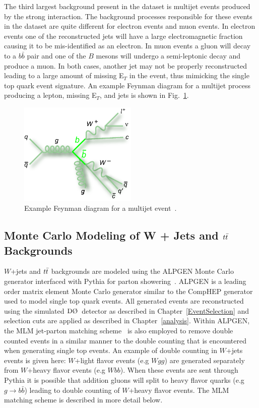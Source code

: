 The third largest background present in the dataset is multijet events produced by the strong interaction. The background processes responsible for these events in the dataset are quite different for electron events and muon events. In electron events one of the reconstructed jets will have a large electromagnetic fraction causing it to be mis-identified as an electron. In muon events a gluon will decay to a $b\bar{b}$ pair and one of the $B$ mesons will undergo a semi-leptonic decay and produce a muon. In both cases, another jet may not be properly reconstructed leading to a large amount of missing E$_{T}$ in the event, thus mimicking the single top quark event signature. An example Feynman diagram for a multijet process producing a lepton, missing E$_{T}$, and jets is shown in Fig.~\ref{qcdexample}.

\begin{figure}[!h!tbp]
\begin{center}
\includegraphics[width=0.5\textwidth]{eps/Feynman/feynman_bbbar_ljets.eps}
\end{center}
\vspace{-0.1in}
\caption{Example Feynman diagram for a multijet event~\cite{feynmandiagrams}.}
\label{qcdexample}
\end{figure}


\subsection{Monte Carlo Modeling of W + Jets and $\mbox{$t\bar{t}$}$ Backgrounds}
\label{wjetsmodel}
$W$+jets and $\mbox{$t\bar{t}$}$ backgrounds are modeled using the ALPGEN Monte Carlo generator interfaced with Pythia for parton showering~\cite{Mangano:2002ea}. ALPGEN is a leading order matrix element Monte Carlo generator similar to the CompHEP generator used to model single top quark events. All generated events are reconstructed using the simulated $\dzero$~detector as described in Chapter~\ref{EventSelection} and selection cuts are applied as described in Chapter~\ref{analysis}. Within ALPGEN, the MLM jet-parton matching scheme~\cite{Hoche:2006ph} is also employed to remove double counted events in a similar manner to the double counting that is encountered when generating single top events. An example of double counting in $W$+jets events is given here: $W$+light flavor events (e.g $Wgg$) are generated separately from $W$+heavy flavor events (e.g $Wbb$). When these events are sent through Pythia it is possible that addition gluons will split to heavy flavor quarks (e.g $g\rightarrow b\bar{b}$) leading to double counting of $W$+heavy flavor events. The MLM matching scheme is described in more detail below.

